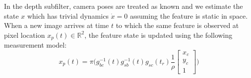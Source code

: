\documentclass[letter,10pt]{article}
\newcommand{\real}{\mathbb{R}}
\begin{document}
In the depth subfilter, camera poses are treated as known and we estimate the state $x$ which has trivial dynamics $\dot x=0$ assuming the feature is static in space. When a new image arrives at time $t$ to which the same feature is observed at pixel location $x_p(t)\in\real^2$, the feature state is updated using the following measurement model:
\begin{equation}
 x_p(t) = \pi\big(g_{bc}^{-1}(t) g_{sb}^{-1}(t) g_{sc}(t_r)
 \frac{1}{\rho}
\begin{bmatrix}
x_c\\
y_c\\
1
\end{bmatrix}
\big)
\end{equation}








\end{document}
